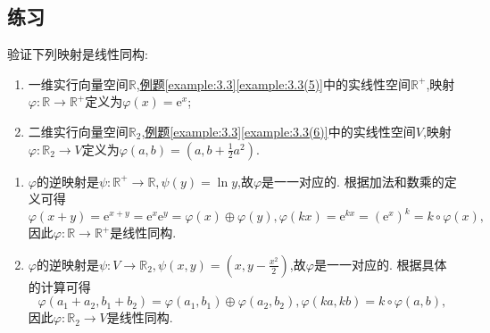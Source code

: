 \documentclass[lang=cn,newtx,10pt,scheme=chinese]{elegantbook}
\begin{document}
\subsection{练习}

\begin{exercise}
验证下列映射是线性同构:
\begin{enumerate}[(1)]
\item 一维实行向量空间\(\mathbb{R}\),\hyperref[example:3.3(5)]{例题}\ref{example:3.3}\ref{example:3.3(5)}中的实线性空间\(\mathbb{R}^+\),映射\(\varphi:\mathbb{R}\to\mathbb{R}^+\)定义为\(\varphi(x)=\mathrm{e}^x\);
\item 二维实行向量空间\(\mathbb{R}_2\),\hyperref[example:3.3(6)]{例题}\ref{example:3.3}\ref{example:3.3(6)}中的实线性空间\(V\),映射\(\varphi:\mathbb{R}_2\to V\)定义为\(\varphi(a,b)=(a,b+\frac{1}{2}a^2)\).
\end{enumerate}
\end{exercise}
\begin{solution}
\begin{enumerate}[(1)]
\item  \(\varphi\)的逆映射是\(\psi:\mathbb{R}^+\to\mathbb{R},\psi(y)=\ln y\),故\(\varphi\)是一一对应的. 根据加法和数乘的定义可得
\[
\varphi(x + y)=\mathrm{e}^{x + y}=\mathrm{e}^x\mathrm{e}^y=\varphi(x)\oplus\varphi(y),\varphi(kx)=\mathrm{e}^{kx}=(\mathrm{e}^x)^k=k\circ\varphi(x),
\]
因此\(\varphi:\mathbb{R}\to\mathbb{R}^+\)是线性同构.
\item \(\varphi\)的逆映射是\(\psi:V\to\mathbb{R}_2,\psi(x,y)=(x,y-\frac{x^2}{2})\),故\(\varphi\)是一一对应的. 根据具体的计算可得
\[
\varphi(a_1 + a_2,b_1 + b_2)=\varphi(a_1,b_1)\oplus\varphi(a_2,b_2),\varphi(ka,kb)=k\circ\varphi(a,b),
\]
因此\(\varphi:\mathbb{R}_2\to V\)是线性同构.
\end{enumerate}
\end{solution}
\end{document}
